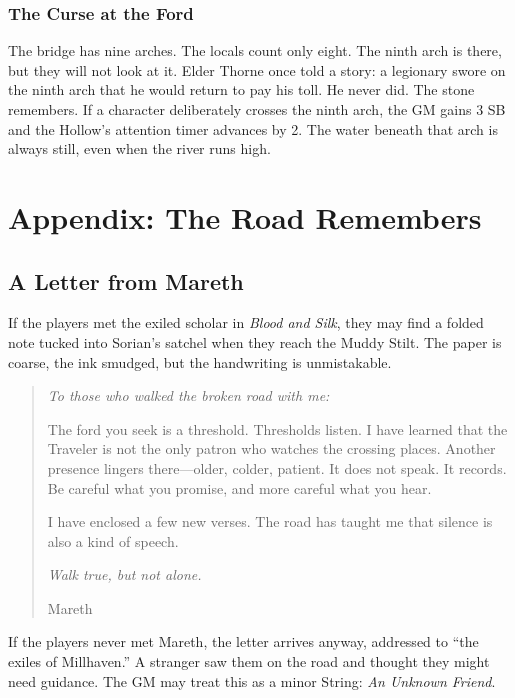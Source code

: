 \documentclass[10pt,twoside]{book}
\begin{document}
\subsection*{The Curse at the Ford}

The bridge has nine arches. The locals count only eight. The ninth arch is there, but they will not look at it. Elder Thorne once told a story: a legionary swore on the ninth arch that he would return to pay his toll. He never did. The stone remembers. If a character deliberately crosses the ninth arch, the GM gains 3 SB and the Hollow's attention timer advances by 2. The water beneath that arch is always still, even when the river runs high.

\newpage
\chapter*{Appendix: The Road Remembers}

\section*{A Letter from Mareth}

If the players met the exiled scholar in \textit{Blood and Silk}, they may find a folded note tucked into Sorian's satchel when they reach the Muddy Stilt. The paper is coarse, the ink smudged, but the handwriting is unmistakable.

\begin{quote}\itshape
To those who walked the broken road with me:

The ford you seek is a threshold. Thresholds listen. I have learned that the Traveler is not the only patron who watches the crossing places. Another presence lingers there---older, colder, patient. It does not speak. It records. Be careful what you promise, and more careful what you hear.

I have enclosed a few new verses. The road has taught me that silence is also a kind of speech.

\textit{Walk true, but not alone.}

Mareth
\end{quote}

If the players never met Mareth, the letter arrives anyway, addressed to ``the exiles of Millhaven.'' A stranger saw them on the road and thought they might need guidance. The GM may treat this as a minor String: \textit{An Unknown Friend}.
\end{document}
